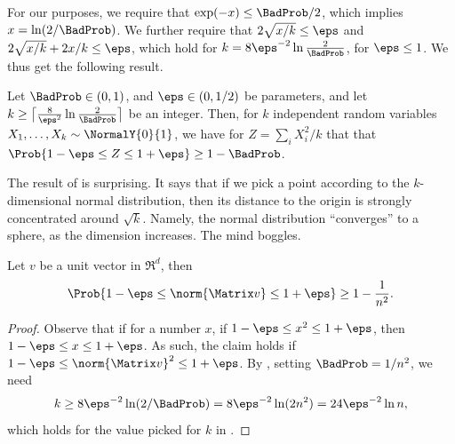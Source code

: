 For our purposes, we require that $\exp(-x) \leq \BadProb/2$, which
implies $x = \ln( 2/\BadProb)$. We further require that
$2 \sqrt{ x/k} \leq \eps$ and $2 \sqrt{ x/k} + 2x/k \leq \eps$, which
hold for $k = 8\eps^{-2} \ln \frac{2}{\BadProb}$, for $\eps \leq 1$.
We thus get the following result.

\begin{corollary}
    Let $\BadProb \in (0,1)$, and $\eps \in (0,1/2)$ be parameters,
    and let
    $k \geq \bigl\lceil{\frac{8}{\eps^2} \ln
       \frac{2}{\BadProb}}\bigr\rceil$ be an integer. Then, for $k$
    independent random variables
    $X_1, \ldots, X_k \sim \NormalY{0}{1}$, we have for
    $Z = \sum_i X_i^2/k$ that that
    $\Prob{ 1-\eps \leq Z \leq 1+\eps} \geq 1 - \BadProb$.
\end{corollary}


\begin{remark}
    The result of  is surprising. It says that if we
    pick a point according to the $k$-dimensional normal distribution,
    then its distance to the origin is strongly concentrated around
    $\sqrt{k}$. Namely, the normal distribution ``converges'' to a
    sphere, as the dimension increases. The mind boggles.
\end{remark}


\begin{lemma}
    Let $v$ be a unit vector in $\Re^d$, then
    \begin{equation*}
        \Prob{ 1-\eps \leq  \norm{\Matrix v } \leq 1+\eps \bigr.}%
        \geq
        1- \frac{1}{n^2}. 
    \end{equation*}
\end{lemma}
\begin{proof}
    Observe that if for a number $x$, if
    $1-\eps \leq x^2 \leq 1+\eps$, then $1-\eps \leq x \leq
    1+\eps$. As such, the claim holds if
    $1-\eps \leq \norm{\Matrix v }^2 \leq 1+\eps$.  By ,
    setting $\BadProb = 1/n^2$, we need
    \begin{equation*}
        k%
        \geq%
        8\eps^{-2}\ln (2/\BadProb)
        =
        8 \eps^{-2} \ln (2n^2)%
        =%
        24 \eps^{-2} \ln n,
    \end{equation*}
    which holds for the value picked for $k$ in 
    .
\end{proof}


